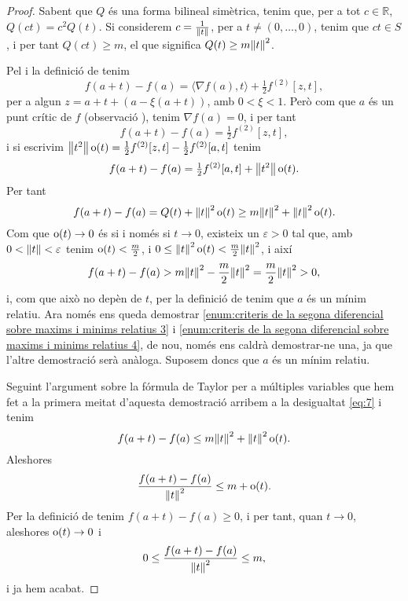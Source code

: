 \documentclass[../Apunts.tex]{subfiles}
\begin{document}
\begin{proposition}
\begin{proof}
			Sabent que \(Q\) és una forma bilineal simètrica, tenim que, per a tot \(c\in\mathbb{R}\), \(Q(ct)=c^{2}Q(t)\). Si considerem \(c=\frac{1}{\norm{t}}\), per a \(t\neq(0,\dots,0)\), tenim que \(ct\in S\), i per tant \(Q(ct)\geq m\), el que significa \(Q(t)\geq m\norm{t} ^{2}\).
			
			Pel  i la definició de  tenim
			\[f(a+t)-f(a)=\langle\nabla f(a),t\rangle+\tfrac{1}{2}f^{(2)}[z,t],\]
			per a algun \(z=a+t+(a-\xi(a+t))\), amb \(0<\xi<1\). Però com que \(a\) és un punt crític de \(f\) (observació ), tenim \(\nabla f(a)=0\), i per tant
			\[f(a+t)-f(a)=\tfrac{1}{2}f^{(2)}[z,t],\]
			i si escrivim \(\norm{t^{2}}\omicron(t)=\frac{1}{2}f^{(2)}[z,t]-\frac{1}{2}f^{(2)}[a,t]\) tenim
			\[f(a+t)-f(a)=\tfrac{1}{2}f^{(2)}[a,t]+\norm{t^{2}}\omicron(t).\]
			Per tant
			\begin{equation}\label{eq:7}
			f(a+t)-f(a)=Q(t)+\norm{t}^{2}\omicron(t)\geq m\norm{t}^{2}+\norm{t}^{2}\omicron(t).
			\end{equation}
			Com que \(\operatorname{o}(t)\to0\) és si i només si \(t\to0\), existeix un \(\varepsilon>0\) tal que, amb \(0<\norm{t}<\varepsilon\) tenim \(\operatorname{o}(t)<\frac{m}{2}\), i \(0\leq\norm{t}^{2}\omicron(t)<\frac{m}{2}\norm{t}^{2}\), i així
			\[f(a+t)-f(a)>m\norm{t}^{2}-\frac{m}{2}\norm{t}^{2}=\frac{m}{2}\norm{t}^{2}>0,\]
			i, com que això no depèn de \(t\), per la definició de  tenim que \(a\) és un mínim relatiu.
			Ara només ens queda demostrar \eqref{enum:criteris de la segona diferencial sobre maxims i minims relatius 3} i \eqref{enum:criteris de la segona diferencial sobre maxims i minims relatius 4}, de nou, només ens caldrà demostrar-ne una, ja que l'altre demostració serà anàloga. Suposem doncs que \(a\) és un mínim relatiu.
			
			Seguint l'argument sobre la fórmula de Taylor per a múltiples variables que hem fet a la primera meitat d'aquesta demostració arribem a la desigualtat \eqref{eq:7} i tenim
			\[f(a+t)-f(a)\leq m\norm{t}^{2}+\norm{t}^{2}\omicron(t).\]
			Aleshores
			\[\frac{f(a+t)-f(a)}{\norm{t}^{2}}\leq m+\omicron(t).\]
			Per la definició de  tenim \(f(a+t)-f(a)\geq0\), i per tant, quan \(t\to0\), aleshores \(\operatorname{o}(t)\to0\) i
			\[0\leq\frac{f(a+t)-f(a)}{\norm{t}^{2}}\leq m,\]
			i ja hem acabat.
		\end{proof}
	\end{proposition}
\end{document}
